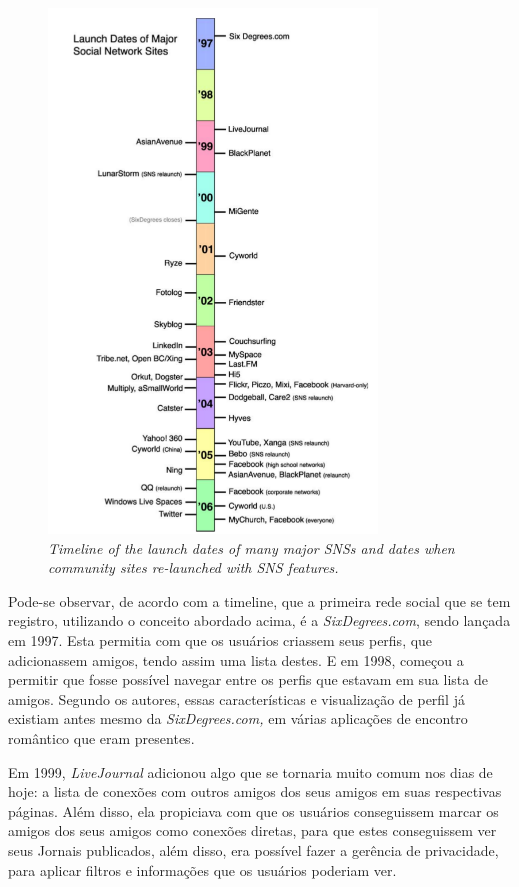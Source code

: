 \begin{figure}[h]
    \centering
    \includegraphics[width=330px, scale=1]{figuras/historicosns}
    \caption{\textit{Timeline of the launch dates of many major SNSs and dates when community sites
re-launched with SNS features. }}
    \label{fig:historicosns}
\end{figure}

Pode-se observar, de acordo com a timeline, que a primeira rede social que se tem
registro, utilizando o conceito abordado acima, é a \textit{SixDegrees.com}, sendo lançada
em 1997. Esta permitia com que os usuários criassem seus perfis, que adicionassem
amigos, tendo assim uma lista destes. E em 1998, começou a permitir que fosse possível
navegar entre os perfis que estavam em sua lista de amigos. Segundo os autores,
essas características e visualização de perfil já existiam antes mesmo da \textit{SixDegrees.com,}
em várias aplicações de encontro romântico que eram presentes.

Em 1999, \textit{LiveJournal} adicionou algo que se tornaria muito comum nos dias de hoje:
a lista de conexões com outros amigos dos seus amigos em suas respectivas páginas.
Além disso, ela propiciava com que os usuários conseguissem marcar os amigos
dos seus amigos como conexões diretas, para que estes conseguissem ver seus Jornais
publicados, além disso, era possível fazer a gerência de privacidade, para
aplicar filtros e informações que os usuários poderiam ver.

